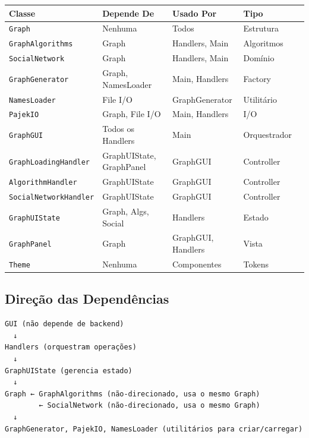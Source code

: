 \documentclass[12pt,a4paper]{article}
\begin{document}
    \begin{table}[h]
        \centering
        \begin{tabular}{|l|l|l|l|l|}
            \hline
            \textbf{Classe} & \textbf{Depende De} & \textbf{Usado Por} & \textbf{Tipo} \\
            \hline
            \texttt{Graph} & Nenhuma & Todos & Estrutura \\
            \hline
            \texttt{GraphAlgorithms} & Graph & Handlers, Main & Algoritmos \\
            \hline
            \texttt{SocialNetwork} & Graph & Handlers, Main & Domínio \\
            \hline
            \texttt{GraphGenerator} & Graph, NamesLoader & Main, Handlers & Factory \\
            \hline
            \texttt{NamesLoader} & File I/O & GraphGenerator & Utilitário \\
            \hline
            \texttt{PajekIO} & Graph, File I/O & Main, Handlers & I/O \\
            \hline
            \texttt{GraphGUI} & Todos os Handlers & Main & Orquestrador \\
            \hline
            \texttt{GraphLoadingHandler} & GraphUIState, GraphPanel & GraphGUI & Controller \\
            \hline
            \texttt{AlgorithmHandler} & GraphUIState & GraphGUI & Controller \\
            \hline
            \texttt{SocialNetworkHandler} & GraphUIState & GraphGUI & Controller \\
            \hline
            \texttt{GraphUIState} & Graph, Algs, Social & Handlers & Estado \\
            \hline
            \texttt{GraphPanel} & Graph & GraphGUI, Handlers & Vista \\
            \hline
            \texttt{Theme} & Nenhuma & Componentes & Tokens \\
            \hline
        \end{tabular}
    \end{table}

    \subsection{Direção das Dependências}

    \begin{verbatim}
GUI (não depende de backend)
  ↓
Handlers (orquestram operações)
  ↓
GraphUIState (gerencia estado)
  ↓
Graph ← GraphAlgorithms (não-direcionado, usa o mesmo Graph)
        ← SocialNetwork (não-direcionado, usa o mesmo Graph)
  ↓
GraphGenerator, PajekIO, NamesLoader (utilitários para criar/carregar)
    \end{verbatim}
\end{document}
